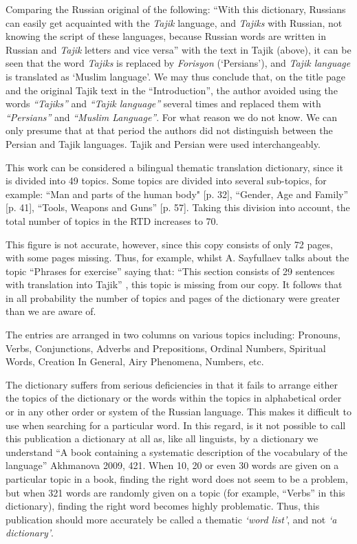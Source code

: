 \documentclass[output=paper,colorlinks,citecolor=brown,arabicfont,chinesefont]{langscibook}
\begin{document}
Comparing the Russian original of the following: “With this dictionary, Russians can easily get acquainted with the \emph{Tajik} language, and \emph{Tajiks} with Russian, not knowing the script of these languages, because Russian words are written in Russian and \emph{Tajik} letters and vice versa” \citep[3]{RTD} with the text in Tajik (above), it can be seen that the word \textit{Tajiks} is replaced by \emph{Forisyon} (`Persians'), and \emph{Tajik language} is translated as `Muslim language'. We may thus conclude that, on the title page and the original Tajik text in the “Introduction”, the author avoided  using the words \emph{“Tajiks”} and \emph{“Tajik language”} several times and replaced them with \emph{“Persians”} and \emph{“Muslim Language”}. For what reason we do not know. We can only presume that at that period the authors did not distinguish between the Persian and Tajik languages. Tajik and Persian were used interchangeably. 

This work can be considered a bilingual thematic translation dictionary, since it is divided into 49 topics. Some topics are divided into several sub-topics, for example: “Man and parts of the human body" [p. 32], “Gender, Age and Family” [p. 41], “Tools, Weapons and Guns” [p. 57]. Taking this division into account, the total number of topics in the RTD increases to 70.

This figure is not accurate, however, since this copy consists of only 72 pages, with some pages missing. Thus, for example, whilst A. Sayfullaev talks about the topic “Phrases for exercise” saying that: “This section consists of 29 sentences with translation into Tajik” \citep[4]{Sayfullaev1983}, this topic is missing from our copy. It follows that in all probability the number of topics and pages of the dictionary were greater than we are aware of.

The entries are arranged in two columns on various topics including: Pronouns, Verbs, Conjunctions, Adverbs and Prepositions, Ordinal Numbers, Spiritual Words, Creation In General, Airy Phenomena, Numbers, etc.

The dictionary suffers from serious deficiencies in that it fails to arrange either the topics of the dictionary or the words within the topics in alphabetical order or in any other order or system of the Russian language. This makes it difficult to use when searching for a particular word. In this regard, is it not possible to call this publication a dictionary at all as, like all linguists, by a dictionary we understand “A book containing a systematic description of the vocabulary of the language” Akhmanova 2009, 421. When 10, 20 or even 30 words are given on a particular topic in a book, finding the right word does not seem to be a problem, but when 321 words are randomly given on a topic (for example, “Verbs” in this dictionary), finding the right word becomes highly problematic. Thus, this publication should more accurately be called a thematic \emph{‘word list’}, and not \emph{‘a dictionary’}. 
\end{document}
